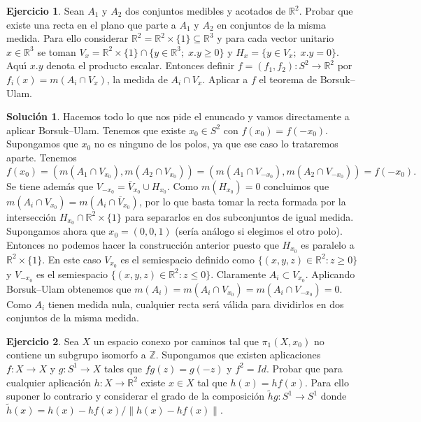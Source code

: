 \documentclass{article}
\theoremstyle{plain}
\theoremstyle{definition}
\newtheorem{exercise}{Ejercicio}
\newtheorem*{sol*}{Solución}
\newcommand{\R}{\mathbb{R}}
\begin{document}
\newpage

\begin{exercise}
Sean $A_1$ y $A_2$ dos conjuntos medibles y acotados de $\mathbb{R}^2$. Probar que existe una recta en el plano que parte a $A_1$ y $A_2$ en conjuntos de la misma medida. Para ello considerar $\mathbb{R}^2= \mathbb{R}^2\times
\{1\}\subseteq \mathbb{R}^3$  y para cada vector unitario $x\in \R^3$
se toman $V_x= \mathbb{R}^2\times \{1\} \cap \{y\in \R^3;\; x.y\ge 0\}$
y $H_x= \{y\in V_x;\; x.y = 0\}$. Aqu\'{\i} $x.y$ denota el producto escalar.
Entonces definir  $f = (f_1, f_2): S^2 \to \R^2$ por $f_i(x)= m(A_i\cap
V_x)$, la medida de  $A_i\cap V_x$. Aplicar a $f$ el teorema de Borsuk--Ulam.
\end{exercise}
\begin{sol*}
Hacemos todo lo que nos pide el enuncado y vamos directamente a aplicar Borsuk--Ulam. Tenemos que existe $x_0\in S^2$ con $f(x_0)=f(-x_0)$. Supongamos que $x_0$ no es ninguno de los polos, ya que ese caso lo trataremos aparte. Tenemos
\[
f(x_0)=(m(A_1\cap V_{x_0}),m(A_2\cap V_{x_0}))=(m(A_1\cap V_{-x_0}),m(A_2\cap V_{-x_0}))=f(-x_0).
\]
Se tiene además que $V_{-x_0}=\overline{V}_{x_0}\cup H_{x_0}$. Como $m(H_{x_0})=0$ concluimos que $m(A_i\cap V_{x_0})=m(A_i\cap\overline{V}_{x_0})$, por lo que basta tomar la recta formada por la intersección $H_{x_0}\cap\R^2\times\{1\}$ para separarlos en dos subconjuntos de igual medida. Supongamos ahora que $x_0=(0,0,1)$ (sería análogo si elegimos el otro polo). Entonces no podemos hacer la construcción anterior puesto que $H_{x_0}$ es paralelo a $\R^2\times\{1\}$. En este caso $V_{x_0}$ es el semiespacio definido como $\{(x,y,z)\in\R^2:z\geq 0\}$ y $V_{-x_0}$ es el semiespacio $\{(x,y,z)\in\R^2:z\leq 0\}$. Claramente $A_i\subset V_{x_0}$. Aplicando Borsuk--Ulam obtenemos que $m(A_i)=m(A_i\cap V_{x_0})=m(A_i\cap V_{-x_0})=0$. Como $A_i$ tienen medida nula, cualquier recta será válida para dividirlos en dos conjuntos de la misma medida.
\end{sol*}

\newpage

\begin{exercise}
Sea $X$ un espacio conexo por caminos tal que $\pi_1(X,x_0)$ no contiene un subgrupo isomorfo a $\mathbb{Z}$. Supongamos que existen aplicaciones
$f: X\to X$ y $g: S^1 \to X$ tales que
$fg(z) = g(-z)$ y $f^2=Id$. Probar que para cualquier aplicaci\'on  $h: X\to \mathbb{R}^2$ existe $x\in X$ tal que $h(x) = hf(x)$. Para ello suponer lo contrario y considerar  el grado de la composici\'on $\widetilde{h} g: S^1
\rightarrow S^1$ donde $\widetilde{h}(x) =
h(x)-hf(x)/\|h(x)-hf(x)\|$.
\end{exercise}
\end{document}
